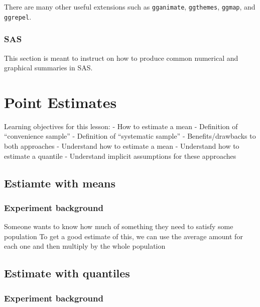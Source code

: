 \documentclass[
]{book}
\theoremstyle{definition}
\theoremstyle{definition}
\theoremstyle{definition}
\theoremstyle{remark}
\begin{document}
There are many other useful extensions such as \texttt{gganimate}, \texttt{ggthemes}, \texttt{ggmap}, and \texttt{ggrepel}.

\hypertarget{sas-2}{%
\subsection{SAS}\label{sas-2}}

This section is meant to instruct on how to produce common numerical and graphical summaries in SAS.

\hypertarget{point-estimates}{%
\chapter{Point Estimates}\label{point-estimates}}

Learning objectives for this lesson:
- How to estimate a mean
- Definition of ``convenience sample''
- Definition of ``systematic sample''
- Benefits/drawbacks to both approaches
- Understand how to estimate a mean
- Understand how to estimate a quantile
- Understand implicit assumptions for these approaches

\hypertarget{estiamte-with-means}{%
\section{Estiamte with means}\label{estiamte-with-means}}

\hypertarget{experiment-background}{%
\subsection{Experiment background}\label{experiment-background}}

Someone wants to know how much of something they need to satisfy some population
To get a good estimate of this, we can use the average amount for each one and then multiply by the whole population

\hypertarget{estimate-with-quantiles}{%
\section{Estimate with quantiles}\label{estimate-with-quantiles}}

\hypertarget{experiment-background-1}{%
\subsection{Experiment background}\label{experiment-background-1}}
\end{document}
